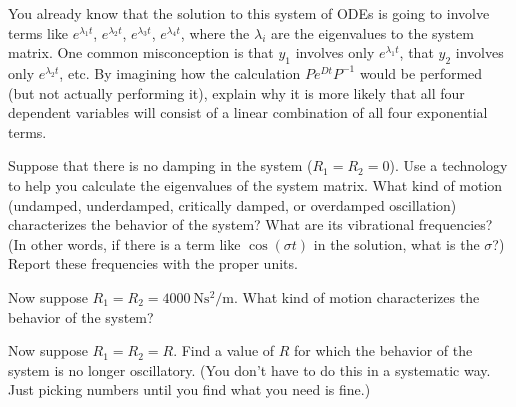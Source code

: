 \documentclass[boxes,printing,blanks,hmc]{gsypset}
\begin{document}
\begin{problem}[5 (continued)]
\begin{subproblems}
\begin{solution}
			\end{solution}
		\subproblem 
			You already know that the solution to this system of ODEs is going to involve terms like
		  $e^{\lambda_1 t}$, $e^{\lambda_2 t}$, $e^{\lambda_3 t}$, $e^{\lambda_4 t}$, 
		  where the $\lambda_i$ are the eigenvalues to the system matrix. 
		  One common misconception is that $y_1$ involves only $e^{\lambda_1 t}$, 
		  that $y_2$ involves only $e^{\lambda_2 t}$, etc. 
		  By imagining how the calculation $Pe^{Dt}P^{-1}$ would be performed 
		  (but not actually performing it), 
		  explain why it is more likely that all four dependent variables will consist of a 
		  linear combination of all four exponential terms.
			\begin{solution}
				
			\end{solution}
		\subproblem 
			Suppose that there is no damping in the system ($R_1=R_2=0$). 
			Use a technology to help you calculate the eigenvalues of the system matrix. 
			What kind of motion (undamped, underdamped, critically damped, or overdamped oscillation)
			characterizes the behavior of the system? 
			What are its vibrational frequencies? 
			(In other words, if there is a term like $\cos(\sigma t)$ in the solution, 
			what is the $\sigma$?) 
			Report these frequencies with the proper units.
			\begin{solution}
				
			\end{solution}
		\subproblem 
			Now suppose $R_1=R_2=\SI{4000}{\N\s^2\per\m}$. 
			What kind of motion characterizes the behavior of the system?
			\begin{solution}
				
			\end{solution}
		\subproblem 
			Now suppose $R_1=R_2=R$. 
			Find a value of $R$ for which the behavior of the system is no longer oscillatory. 
			(You don't have to do this in a systematic way. 
			Just picking numbers until you find what you need is fine.)
			\begin{solution}
				
			\end{solution}
	\end{subproblems}
\end{problem}
\end{document}
